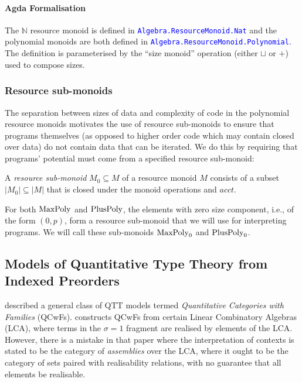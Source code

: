 \documentclass[acmsmall,screen]{acmart}
\newcommand{\AgdaModule}[1]{\textcolor{blue}{\tt #1}}
\begin{document}
\paragraph{Agda Formalisation} The $\mathbb{N}$ resource monoid is
defined in \AgdaModule{Algebra.ResourceMonoid.Nat} and the polynomial
monoids are both defined in
\AgdaModule{Algebra.ResourceMonoid.Polynomial}. The definition is
parameterised by the ``size monoid'' operation (either $\sqcup$ or
$+$) used to compose sizes.

\subsubsection{Resource sub-monoids}

The separation between sizes of data and complexity of code in the
polynomial resource monoids motivates the use of resource sub-monoids
to ensure that programs themselves (as opposed to higher order code
which may contain closed over data) do not contain data that can be
iterated. We do this by requiring that programs' potential must come
from a specified resource sub-monoid:

\begin{definition}
  A \emph{resource sub-monoid} $M_0 \subseteq M$ of a resource monoid
  $M$ consists of a subset $|M_0| \subseteq |M|$ that is closed under
  the monoid operations and $\mathit{acct}$.
\end{definition}

For both $\mathrm{MaxPoly}$ and $\mathrm{PlusPoly}$, the elements with zero size
component, i.e., of the form $(0,p)$, form a resource sub-monoid that
we will use for interpreting programs. We will call these sub-monoids
$\mathrm{MaxPoly}_0$ and $\mathrm{PlusPoly}_0$.

\subsection{Models of Quantitative Type Theory from Indexed Preorders}
\label{sec:qtt-models}

\citet{atkey18qtt} described a general class of QTT models termed
\emph{Quantitative Categories with Families}
(QCwFs). \citet{atkey18qtt} constructs QCwFs from certain Linear
Combinatory Algebras (LCA), where terms in the $\sigma = 1$ fragment
are realised by elements of the LCA. However, there is a mistake in
that paper where the interpretation of contexts is stated to be the
category of \emph{assemblies} over the LCA, where it ought to be the
category of sets paired with realisability relations, with no
guarantee that all elements be realisable.
\end{document}
